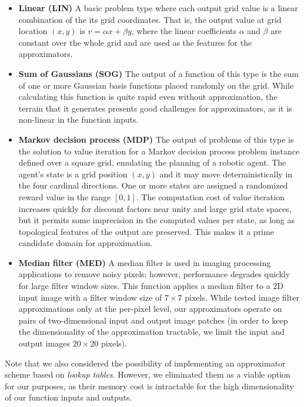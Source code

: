 \documentclass{article}
\begin{document}
\begin{itemize}
\item \textbf{Linear (LIN)} A basic problem type where each output grid value is a linear combination of the its grid coordinates. That is, the output value at grid location $(x, y)$ is $v = \alpha x + \beta y$, where the linear coefficients $\alpha$ and $\beta$ are constant over the whole grid and are used as the features for the approximators.

\item \textbf{Sum of Gaussians (SOG)} The output of a function of this type is the sum of one or more Gaussian basis functions placed randomly on the grid. While calculating this function is quite rapid even without approximation, the terrain that it generates presents good challenges for approximators, as it is non-linear in the function inputs.

\item \textbf{Markov decision process (MDP)} The output of problems of this type is the solution to value iteration for a Markov decision process problem instance defined over a square grid, emulating the planning of a robotic agent. The agent's state is a grid position $(x, y)$ and it may move deterministically in the four cardinal directions. One or more states are assigned a randomized reward value in the range $[0, 1]$. The computation cost of value iteration increases quickly for discount factors near unity and large grid state spaces, but it permits some imprecision in the computed values per state, as long as topological features of the output are preserved. This makes it a prime candidate domain for approximation.

\item \textbf{Median filter (MED)} A median filter is used in imaging processing applications to remove noisy pixels; however, performance degrades quickly for large filter window sizes. This function applies a median filter to a 2D input image with a filter window size of $7 \times 7$ pixels. While \cite{Esmaeilzadeh12} tested image filter approximations only at the per-pixel level, our approximators operate on pairs of two-dimensional input and output image patches (in order to keep the dimensionality of the approximation tractable, we limit the input and output images $20 \times 20$ pixels).
\end{itemize}

Note that we also considered the possibility of implementing an approximator scheme based on \textit{lookup tables}. However, we eliminated them as a viable option for our purposes, as their memory cost is intractable for the high dimensionality of our function inputs and outputs.
\end{document}
